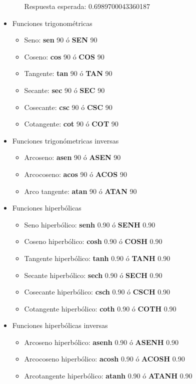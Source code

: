 \documentclass[10pt]{report}
\begin{document}
\begin{itemize}
\begin{itemize}
Respuesta esperada: 0.6989700043360187
\end{itemize}

\item Funciones trigonométricas

\begin{itemize}
\item Seno: \textbf{sen} 90 ó \textbf{SEN} 90
\item Coseno: \textbf{cos} 90 ó \textbf{COS} 90
\item Tangente: \textbf{tan} 90 ó \textbf{TAN} 90
\item Secante: \textbf{sec} 90 ó \textbf{SEC} 90
\item Cosecante: \textbf{csc} 90 ó \textbf{CSC} 90
\item Cotangente: \textbf{cot} 90 ó \textbf{COT} 90
\end{itemize}

\item Funciones trigonómetricas inversas
\begin{itemize}
\item Arcoseno: \textbf{asen} 90 ó \textbf{ASEN} 90
\item Arcocoseno: \textbf{acos} 90 ó \textbf{ACOS} 90
\item Arco tangente: \textbf{atan} 90 ó \textbf{ATAN} 90
\end{itemize}

\item Funciones hiperbólicas

\begin{itemize}
\item Seno hiperbólico: \textbf{senh} 0.90 ó \textbf{SENH} 0.90
\item Coseno hiperbólico: \textbf{cosh} 0.90 ó \textbf{COSH} 0.90
\item Tangente hiperbólico: \textbf{tanh} 0.90 ó \textbf{TANH} 0.90
\item Secante hiperbólico: \textbf{sech} 0.90 ó \textbf{SECH} 0.90
\item Cosecante hiperbólico: \textbf{csch} 0.90 ó \textbf{CSCH} 0.90
\item Cotangente hiperbólico: \textbf{coth} 0.90 ó \textbf{COTH} 0.90
\end{itemize}

\item Funciones hiperbólicas inversas

\begin{itemize}
\item Arcoseno hiperbólico: \textbf{asenh} 0.90 ó \textbf{ASENH} 0.90
\item Arcocoseno hiperbólico: \textbf{acosh} 0.90 ó \textbf{ACOSH} 0.90
\item Arcotangente hiperbólico: \textbf{atanh} 0.90 ó \textbf{ATANH} 0.90
\end{itemize}

\end{itemize}
\end{document}
